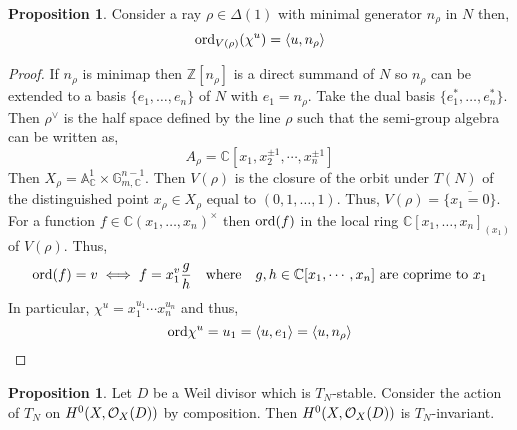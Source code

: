\documentclass[12pt]{extarticle}
\newcommand{\Z}{\mathbb{Z}}
\newcommand{\C}{\mathbb{C}}
\theoremstyle{definition}
\newtheorem{proposition}[theorem]{Proposition}
\newcommand{\inner}[2]{\left< #1, #2 \right>}
\begin{document}
\begin{proposition}
Consider a ray $\rho \in \Delta(1)$ with minimal generator $n_\rho$ in $N$ then,
\[ \ord_{V(\rho)}(\chi^u) = \inner{u}{n_\rho} \]
\end{proposition}

\begin{proof}
If $n_\rho$ is minimap then $\Z[n_\rho]$ is a direct summand of $N$ so $n_\rho$ can be extended to a basis $\{ e_1, \dots, e_n \}$ of $N$ with $e_1 = n_\rho$. Take the dual basis $\{ e_1^*, \dots, e_n^* \}$. Then $\rho^\vee$ is the half space defined by the line $\rho$ such that the semi-group algebra can be written as,
\[ A_\rho = \C[ x_1, x_2^{\pm 1}, \cdots, x_n^{\pm 1}] \]
Then $X_\rho = \mathbb{A}^1_\C \times \mathbb{G}_{m,\C}^{n-1}$. Then $V(\rho)$ is the closure of the orbit under $T(N)$ of the distinguished point $x_\rho \in X_\rho$ equal to $(0, 1, \dots, 1)$. Thus, $V(\rho) = \overline{\{ x_1 = 0 \}}$. For a function $f \in \C(x_1, \dots, x_n)^\times$ then $\mathrm{ord}(f)$ in the local ring $\C[x_1, \dots, x_n]_{(x_1)}$ of $V(\rho)$. Thus,
\[ \ord(f) = v \iff f = x_1^v \frac{g}{h} \quad \text{where} \quad g,h \in \C[x_1, \cdots, x_n] \text{ are coprime to } x_1 \]
In particular, $\chi^u = x_1^{u_1} \cdots x_n^{u_n}$ and thus,
\[ \ord{\chi^u} = u_1 = \inner{u}{e_1} = \inner{u}{n_\rho} \]
\end{proof}

\begin{proposition}
Let $D$ be a Weil divisor which is $T_N$-stable. Consider the action of $T_N$ on $H^0(X, \mathcal{O}_{X}(D))$ by composition. Then $H^0(X, \mathcal{O}_{X}(D))$ is $T_N$-invariant. 
\end{proposition}
\end{document}

